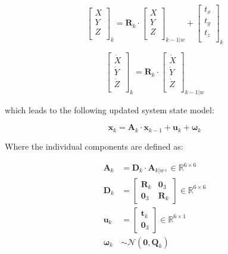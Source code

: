 \begin{equation}
  \begin{bmatrix}
    X \\
    Y \\
    Z \\
  \end{bmatrix}_k
  =
  \mathbf{R}_k
  \cdot
  \begin{bmatrix}
    X \\
    Y \\
    Z \\
  \end{bmatrix}_{k-1|w}
  +
  \begin{bmatrix}
    t_x \\
    t_y \\
    t_z \\
  \end{bmatrix}_k
\end{equation}

\begin{equation}
  \begin{bmatrix}
    \dot{X} \\
    \dot{Y} \\
    \dot{Z} \\
  \end{bmatrix}_k
  =
  \mathbf{R}_k
  \cdot
  \begin{bmatrix}
    \dot{X} \\
    \dot{Y} \\
    \dot{Z} \\
  \end{bmatrix}_{k-1|w}
\end{equation}

which leads to the following updated system state model: 

\begin{equation}
  \mathbf{x}_k = \mathbf{A}_k \cdot \mathbf{x}_{k-1} + \mathbf{u}_k + \boldsymbol{\omega}_k
\end{equation}

Where the individual components are defined as:

\begin{align}
  \mathbf{A}_k &= \mathbf{D}_k \cdot \mathbf{A}_{k|w}, \in \mathbb{R}^{6 \times 6} \\
  \mathbf{D}_k &=
  \begin{bmatrix}
    \mathbf{R}_k & \mathbf{0}_3 \\
    \mathbf{0}_3 & \mathbf{R}_k
  \end{bmatrix}
  \in \mathbb{R}^{6 \times 6} \\
  \mathbf{u}_k &=
  \begin{bmatrix}
    \mathbf{t}_k \\
    \mathbf{0}_3
  \end{bmatrix}
  \in \mathbb{R}^{6 \times 1} \\
  \boldsymbol{\omega}_k &\sim \mathcal{N}(\mathbf{0}, \mathbf{Q}_k)
\end{align}


